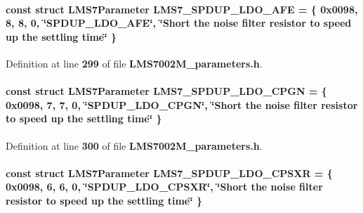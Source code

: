 \paragraph[{L\+M\+S7\+\_\+\+S\+P\+D\+U\+P\+\_\+\+L\+D\+O\+\_\+\+A\+FE}]{\setlength{\rightskip}{0pt plus 5cm}const struct {\bf L\+M\+S7\+Parameter} L\+M\+S7\+\_\+\+S\+P\+D\+U\+P\+\_\+\+L\+D\+O\+\_\+\+A\+FE = \{ 0x0098, 8, 8, 0, \char`\"{}\+S\+P\+D\+U\+P\+\_\+\+L\+D\+O\+\_\+\+A\+F\+E\char`\"{}, \char`\"{}\+Short the noise filter resistor to speed up the settling time\char`\"{} \}\hspace{0.3cm}{\ttfamily [static]}}\label{LMS7002M__parameters_8h_ac03c4185afe158e2b866566c5a2d03a9}


Definition at line {\bf 299} of file {\bf L\+M\+S7002\+M\+\_\+parameters.\+h}.

\paragraph[{L\+M\+S7\+\_\+\+S\+P\+D\+U\+P\+\_\+\+L\+D\+O\+\_\+\+C\+P\+GN}]{\setlength{\rightskip}{0pt plus 5cm}const struct {\bf L\+M\+S7\+Parameter} L\+M\+S7\+\_\+\+S\+P\+D\+U\+P\+\_\+\+L\+D\+O\+\_\+\+C\+P\+GN = \{ 0x0098, 7, 7, 0, \char`\"{}\+S\+P\+D\+U\+P\+\_\+\+L\+D\+O\+\_\+\+C\+P\+G\+N\char`\"{}, \char`\"{}\+Short the noise filter resistor to speed up the settling time\char`\"{} \}\hspace{0.3cm}{\ttfamily [static]}}\label{LMS7002M__parameters_8h_a8a925a8e64c4f1d818e5d406ecadbf0b}


Definition at line {\bf 300} of file {\bf L\+M\+S7002\+M\+\_\+parameters.\+h}.

\paragraph[{L\+M\+S7\+\_\+\+S\+P\+D\+U\+P\+\_\+\+L\+D\+O\+\_\+\+C\+P\+S\+XR}]{\setlength{\rightskip}{0pt plus 5cm}const struct {\bf L\+M\+S7\+Parameter} L\+M\+S7\+\_\+\+S\+P\+D\+U\+P\+\_\+\+L\+D\+O\+\_\+\+C\+P\+S\+XR = \{ 0x0098, 6, 6, 0, \char`\"{}\+S\+P\+D\+U\+P\+\_\+\+L\+D\+O\+\_\+\+C\+P\+S\+X\+R\char`\"{}, \char`\"{}\+Short the noise filter resistor to speed up the settling time\char`\"{} \}\hspace{0.3cm}{\ttfamily [static]}}\label{LMS7002M__parameters_8h_ac8421b5f1593cbb645913739f8f7cd96}


